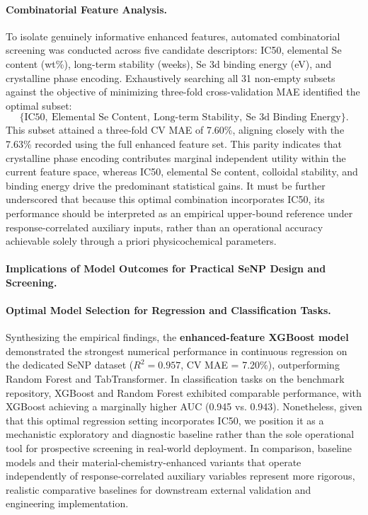 \documentclass[letterpaper]{article}
\begin{document}
\paragraph{Combinatorial Feature Analysis.}
To isolate genuinely informative enhanced features, automated combinatorial screening was conducted across five candidate descriptors: IC50, elemental Se content (wt\%), long-term stability (weeks), Se 3d binding energy (eV), and crystalline phase encoding. Exhaustively searching all 31 non-empty subsets against the objective of minimizing three-fold cross-validation MAE identified the optimal subset:
\[
\{\text{IC50},\ \text{Elemental Se Content},\ \text{Long-term Stability},\ \text{Se 3d Binding Energy}\}.
\]
This subset attained a three-fold CV MAE of 7.60\%, aligning closely with the 7.63\% recorded using the full enhanced feature set. This parity indicates that crystalline phase encoding contributes marginal independent utility within the current feature space, whereas IC50, elemental Se content, colloidal stability, and binding energy drive the predominant statistical gains. It must be further underscored that because this optimal combination incorporates IC50, its performance should be interpreted as an empirical upper-bound reference under response-correlated auxiliary inputs, rather than an operational accuracy achievable solely through a priori physicochemical parameters.

\paragraph{Implications of Model Outcomes for Practical SeNP Design and Screening.}

\paragraph{Optimal Model Selection for Regression and Classification Tasks.}
Synthesizing the empirical findings, the \textbf{enhanced-feature XGBoost model} demonstrated the strongest numerical performance in continuous regression on the dedicated SeNP dataset ($R^2 = 0.957$, CV MAE = 7.20\%), outperforming Random Forest and TabTransformer. In classification tasks on the benchmark repository, XGBoost and Random Forest exhibited comparable performance, with XGBoost achieving a marginally higher AUC (0.945 vs. 0.943). Nonetheless, given that this optimal regression setting incorporates IC50, we position it as a mechanistic exploratory and diagnostic baseline rather than the sole operational tool for prospective screening in real-world deployment. In comparison, baseline models and their material-chemistry-enhanced variants that operate independently of response-correlated auxiliary variables represent more rigorous, realistic comparative baselines for downstream external validation and engineering implementation.
\end{document}
